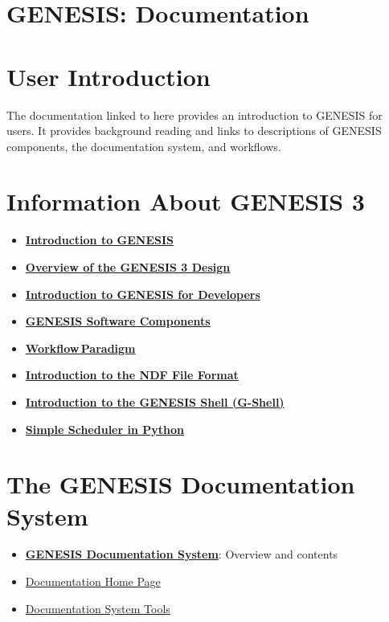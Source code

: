 \documentclass[12pt]{article}
\begin{document}
\section*{GENESIS: Documentation}


\section*{User Introduction}

The documentation linked to here provides an introduction to GENESIS for
users.  It provides background reading and links to descriptions of GENESIS
components, the documentation system, and workflows.

\section*{Information About GENESIS 3}

\begin{itemize}
   \item[]\href{../genesis-intro/genesis-intro.tex}{\bf Introduction to GENESIS}
   \item[]\href{../genesis-overview/genesis-overview.tex}{\bf Overview of the GENESIS 3 Design}
   \item[]\href{../developer-intro/developer-intro.tex}{\bf Introduction to GENESIS for Developers}
   \item[]\href{../genesis-components/genesis-components.tex}{\bf GENESIS Software Components}
   \item[]\href{../workflow-intro/workflow-intro.tex}{\bf Workflow\,Paradigm}
   \item[]\href{../ndf-file-format/ndf-file-format.tex}{\bf Introduction to the NDF File Format}
   \item[]\href{../gshell/gshell.tex}{\bf Introduction to the GENESIS Shell (G-Shell)}
   \item[]\href{../sspy/sspy.tex}{\bf Simple Scheduler in Python}
\end{itemize}

\section*{The GENESIS Documentation System}

\begin{itemize}
   \item[]\href{../documentation-overview/documentation-overview.tex}{\bf GENESIS
                Documentation System}: Overview and contents
   \item[]\href{../documentation-homepage/documentation-homepage.tex}{Documentation Home Page}
   \item[]\href{../document-tools/document-tools.tex}{Documentation System Tools}
\end{itemize}
\end{document}
